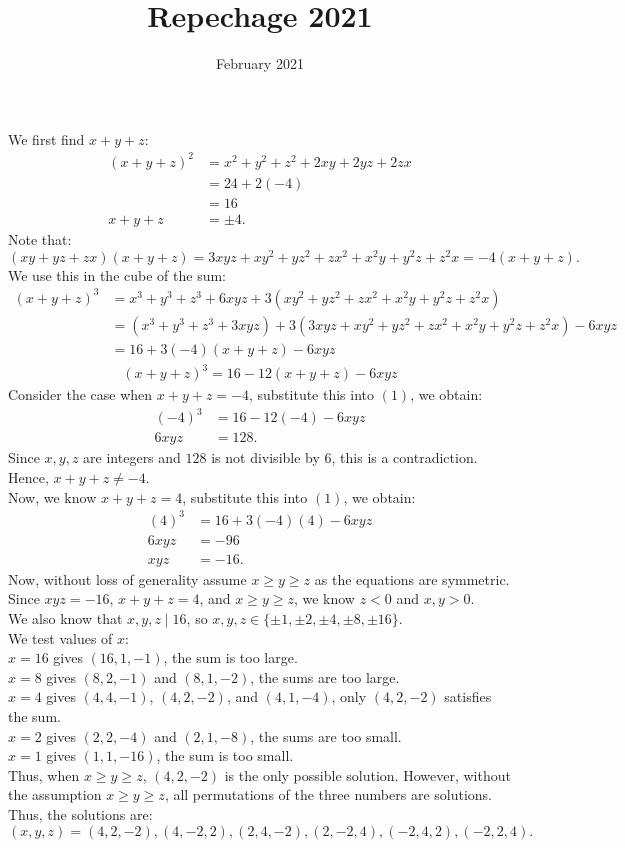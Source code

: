 \documentclass{article}
\title{Repechage 2021}
\date{February 2021}
\begin{document}
We first find $x+y+z$:
\begin{align*}
    (x + y + z)^2 &= x^2 + y^2 + z^2 + 2xy + 2yz + 2zx \\
    &= 24 + 2(-4) \\
    &= 16 \\
    x + y + z &= \pm 4.
\end{align*}
Note that:
$$(xy + yz + zx)(x + y + z) = 3xyz + xy^2 + yz^2 + zx^2 + x^2y + y^2z + z^2x = -4(x + y + z).$$
We use this in the cube of the sum:
\begin{align*}
    (x + y + z)^3 &= x^3 + y^3 + z^3 + 6xyz + 3(xy^2 + yz^2 + zx^2 + x^2y + y^2z + z^2x) \\
    &= (x^3 + y^3 + z^3 + 3xyz) + 3(3xyz + xy^2 + yz^2 + zx^2 + x^2y + y^2z + z^2x) - 6xyz \\
    &= 16 + 3(-4)(x + y + z) - 6xyz
\end{align*}
\begin{align}
(x + y + z)^3 = 16 - 12(x + y + z) - 6xyz
\end{align}
Consider the case when $x + y + z = -4$, substitute this into $(1)$, we obtain:
\begin{align*}
    (-4)^3 &= 16 - 12(-4) - 6xyz \\
    6xyz &= 128.
\end{align*}
Since $x,y,z$ are integers and $128$ is not divisible by $6$, this is a contradiction. Hence, $x+y+z\neq -4$. \\

Now, we know $x + y + z = 4$, substitute this into $(1)$, we obtain:
\begin{align*}
    (4)^3 &= 16 + 3(-4)(4) - 6xyz \\
    6xyz &= -96 \\
    xyz &= -16.
\end{align*}
Now, without loss of generality assume $x\ge y\ge z$ as the equations are symmetric. \\
Since $xyz = -16$, $x + y + z = 4$, and $x\ge y\ge z$, we know $z < 0$ and $x,y > 0$. \\
We also know that $x,y,z\mid 16$, so $x,y,z \in \{\pm1,\pm2,\pm4,\pm8,\pm16\}$. \\
We test values of $x$: \\
$x=16$ gives $(16,1,-1)$, the sum is too large. \\
$x=8$ gives $(8,2,-1)$ and $(8,1,-2)$, the sums are too large. \\
$x=4$ gives $(4,4,-1)$, $(4,2,-2)$, and $(4,1,-4)$, only $(4,2,-2)$ satisfies the sum. \\
$x=2$ gives $(2,2,-4)$ and $(2,1,-8)$, the sums are too small. \\
$x=1$ gives $(1,1,-16)$, the sum is too small. \\

Thus, when $x\ge y\ge z$, $(4,2,-2)$ is the only possible solution.
However, without the assumption $x\ge y\ge z$, all permutations of the three numbers are solutions.
Thus, the solutions are:
$$(x,y,z) = (4,2,-2),(4,-2,2),(2,4,-2),(2,-2,4),(-2,4,2),(-2,2,4).$$
\end{document}
